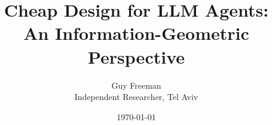 \documentclass[11pt]{article}
\title{Cheap Design for LLM Agents: \\An Information-Geometric Perspective}
\author{
  Guy Freeman \\
  Independent Researcher, Tel Aviv
}
\date{\today}
\newcommand{\credence}{\textsc{Credence}}
\begin{document}
\maketitle

\begin{abstract}
\end{abstract}



%
\end{document}
